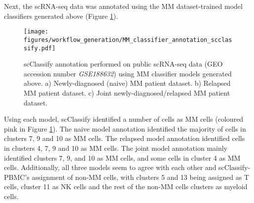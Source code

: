 Next, the scRNA-seq data was annotated using the MM dataset-trained model classifiers generated above (Figure \ref{fig:mm_classifier_scclassify_annotate}).
%
\begin{figure}[htb]
\centering
\texttt{[image: figures/workflow\_generation/MM\_classifier\_annotation\_scclassify.pdf]}
\caption[Public scRNA-seq data MM classifier annotation]{scClassify annotation performed on public scRNA-seq data (GEO accession number \textit{GSE188632}) using MM classifier models generated above.
a) Newly-diagnosed (naive) MM patient dataset.
b) Relapsed MM patient dataset.
c) Joint newly-diagnosed/relapsed MM patient dataset.
}
\label{fig:mm_classifier_scclassify_annotate}
\end{figure}
%
%
Using each model, scClassify identified a number of cells as MM cells (coloured pink in Figure \ref{fig:mm_classifier_scclassify_annotate}).
The naive model annotation identified the majority of cells in clusters 7, 9 and 10 as MM cells.
The relapsed model annotation identified cells in clusters 4, 7, 9 and 10 as MM cells.
The joint model annotation mainly identified clusters 7, 9, and 10 as MM cells, and some cells in cluster 4 as MM cells.
Additionally, all three models seem to agree with each other and scClassify-PBMC's assignment of non-MM cells, with clusters 5 and 13 being assigned as T cells, cluster 11 as NK cells and the rest of the non-MM cells clusters as myeloid cells.


